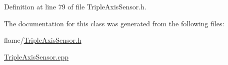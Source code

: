 Definition at line 79 of file Triple\-Axis\-Sensor.\-h.



The documentation for this class was generated from the following files\-:\begin{DoxyCompactItemize}
\item 
flame/\hyperlink{_triple_axis_sensor_8h}{Triple\-Axis\-Sensor.\-h}\item 
\hyperlink{_triple_axis_sensor_8cpp}{Triple\-Axis\-Sensor.\-cpp}\end{DoxyCompactItemize}
